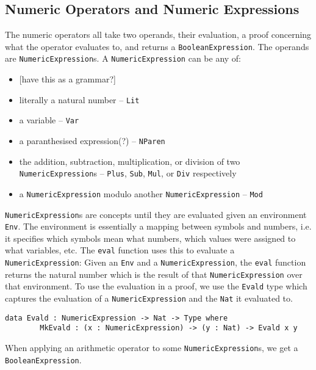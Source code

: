     \subsection{Numeric Operators and Numeric Expressions}
        The numeric operators all take two operands, their evaluation, a proof concerning what the operator evaluates to, and returns a \texttt{BooleanExpression}.
        The operands are \texttt{NumericExpression}s. A \texttt{NumericExpression} can be any of:
        \begin{itemize}
            \item {[have this as a grammar?]}
            \item literally a natural number -- \texttt{Lit}
            \item a variable -- \texttt{Var}
            \item a paranthesised expression(?) -- \texttt{NParen}
            \item the addition, subtraction, multiplication, or division of two\\
                  \texttt{NumericExpression}s -- \texttt{Plus}, \texttt{Sub},
                  \texttt{Mul}, or \texttt{Div} respectively
            \item a \texttt{NumericExpression} modulo another 
                  \texttt{NumericExpression} -- \texttt{Mod}
        \end{itemize}
        \texttt{NumericExpression}s are concepts until they are evaluated given an environment \texttt{Env}. The environment is essentially a mapping between symbols and numbers, i.e. it specifies which symbols mean what numbers, which values were assigned to what variables, etc. The \texttt{eval} function uses this to evaluate a \texttt{NumericExpression}: Given an \texttt{Env} and a \texttt{NumericExpression}, the \texttt{eval} function returns the natural number which is the result of that \texttt{NumericExpression} over that environment. To use the evaluation in a proof, we use the \texttt{Evald} type which captures the evaluation of a \texttt{NumericExpression} and the \texttt{Nat} it evaluated to.
        \begin{lstlisting}[caption={\texttt{Evald} as defined in the \textsc{TeamPlay} DSL}]
    data Evald : NumericExpression -> Nat -> Type where
        MkEvald : (x : NumericExpression) -> (y : Nat) -> Evald x y
        \end{lstlisting}
        When applying an arithmetic operator to some \texttt{NumericExpression}s, we get a \texttt{BooleanExpression}.
    
